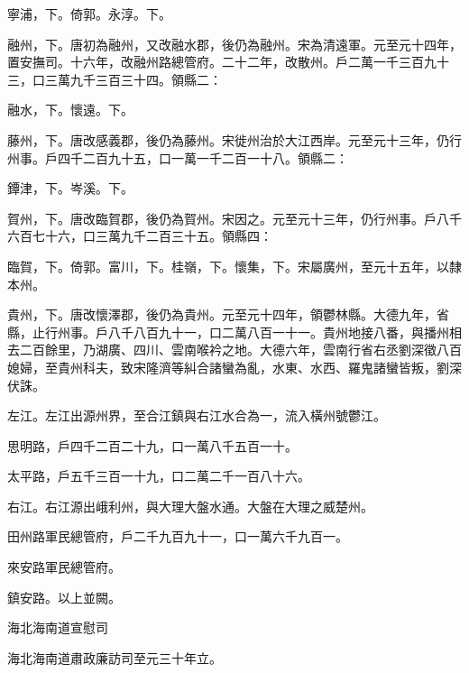 \begin{pinyinscope}
 寧浦，下。倚郭。永淳。下。



 融州，下。唐初為融州，又改融水郡，後仍為融州。宋為清遠軍。元至元十四年，置安撫司。十六年，改融州路總管府。二十二年，改散州。戶二萬一千三百九十三，口三萬九千三百三十四。領縣二：



 融水，下。懷遠。下。



 藤州，下。唐改感義郡，後仍為藤州。宋徙州治於大江西岸。元至元十三年，仍行州事。戶四千二百九十五，口一萬一千二百一十八。領縣二：



 鐔津，下。岑溪。下。



 賀州，下。唐改臨賀郡，後仍為賀州。宋因之。元至元十三年，仍行州事。戶八千六百七十六，口三萬九千二百三十五。領縣四：



 臨賀，下。倚郭。富川，下。桂嶺，下。懷集，下。宋屬廣州，至元十五年，以隸本州。



 貴州，下。唐改懷澤郡，後仍為貴州。元至元十四年，領鬱林縣。大德九年，省縣，止行州事。戶八千八百九十一，口二萬八百一十一。貴州地接八番，與播州相去二百餘里，乃湖廣、四川、雲南喉衿之地。大德六年，雲南行省右丞劉深徵八百媳婦，至貴州科夫，致宋隆濟等糾合諸蠻為亂，水東、水西、羅鬼諸蠻皆叛，劉深伏誅。



 左江。左江出源州界，至合江鎮與右江水合為一，流入橫州號鬱江。



 思明路，戶四千二百二十九，口一萬八千五百一十。



 太平路，戶五千三百一十九，口二萬二千一百八十六。



 右江。右江源出峨利州，與大理大盤水通。大盤在大理之威楚州。



 田州路軍民總管府，戶二千九百九十一，口一萬六千九百一。



 來安路軍民總管府。



 鎮安路。以上並闕。



 海北海南道宣慰司



 海北海南道肅政廉訪司至元三十年立。




\end{pinyinscope}
